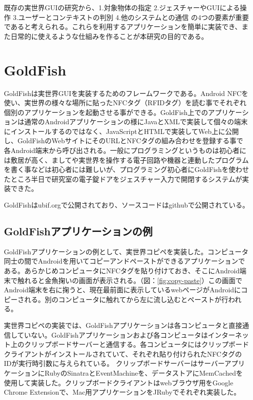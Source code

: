 既存の実世界GUIの研究から、1.対象物体の指定 2.ジェスチャーやGUIによる操作 3.ユーザーとコンテキストの判別 4.他のシステムとの通信 の4つの要素が重要であると考えられる。これらを利用するアプリケーションを簡単に実装でき、また日常的に使えるような仕組みを作ることが本研究の目的である。


\section{GoldFish}
GoldFishは実世界GUIを実装するためのフレームワークである。Android NFCを使い、実世界の様々な場所に貼ったNFCタグ（RFIDタグ）を読む事でそれぞれ個別のアプリケーションを起動させる事ができる。GoldFish上でのアプリケーションは通常のAndroidアプリケーションの様にJavaとXMLで実装して個々の端末にインストールするのではなく、JavaScriptとHTMLで実装してWeb上に公開し、GoldFishのWebサイトにそのURLとNFCタグの組み合わせを登録する事で各Android端末から呼び出される。一般にプログラミングというものは初心者には敷居が高く、ましてや実世界を操作する電子回路や機器と連動したプログラムを書く事などは初心者には難しいが、プログラミング初心者にGoldFishを使わせたところ半日で研究室の電子錠ドアをジェスチャー入力で開閉するシステムが実装できた。

GoldFishはubif.org\cite{goldfish}で公開されており、ソースコードはgithubで公開されている。\cite{github}


\subsection{GoldFishアプリケーションの例}
GoldFishアプリケーションの例として、実世界コピペを実装した。コンピュータ同士の間でAndroidを用いてコピーアンドペーストができるアプリケーションである。あらかじめコンピュータにNFCタグを貼り付けておき、そこにAndroid端末で触れると金魚掬いの画面が表示される。（図：\ref{fig:copy-paste}）この画面でAndroid端末を右に掬うと、現在最前面に表示しているwebページがAndroidにコピーされる。別のコンピュータに触れてから左に流し込むとペーストが行われる。

実世界コピペの実装では、GoldFishアプリケーションは各コンピュータと直接通信していない。GoldFishアプリケーションおよび各コンピュータはインターネット上のクリップボードサーバーと通信する。各コンピュータにはクリップボードクライアントがインストールされていて、それぞれ貼り付けられたNFCタグのIDが実行時引数に与えられている。
クリップボードサーバーはサーバーアプリケーションにRubyのSinatraとEventMachineを、データストアにMemCachedを使用して実装した。クリップボードクライアントはwebブラウザ用をGoogle Chrome Extensionで、Mac用アプリケーションをJRubyでそれぞれ実装した。

